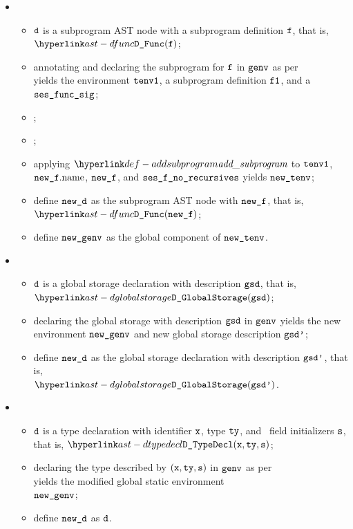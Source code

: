 \ProseParagraph
\OneApplies
\begin{itemize}
  \item {}
  \begin{itemize}
    \item $\texttt{d}$ is a subprogram AST node with a subprogram definition $\texttt{f}$, that is, $\DFunc(\vf)$;
    \item annotating and declaring the subprogram for $\texttt{f}$ in $\texttt{genv}$ as per \\
          yields the environment $\texttt{tenv1}$, a subprogram definition $\vfone$,
          and a \sideeffectdescriptorsetsterm{} $\texttt{ses\_func\_sig}$\ProseOrTypeError;
    \item \Proseannotatesubprogram{$\tenv$}{$\vfone$}{\vsesfuncsig}{$\newf$}{$\vsesf$}\ProseOrTypeError;
    \item {};
    \item applying $\addsubprogram$ to $\texttt{tenv1}$, $\texttt{new\_f}.\text{name}$, $\newf$, and $\texttt{ses\_f\_no\_recursives}$ yields $\texttt{new\_tenv}$;
    \item define $\texttt{new\_d}$ as the subprogram AST node with $\newf$, that is, $\DFunc(\newf)$;
    \item define $\texttt{new\_genv}$ as the global component of $\texttt{new\_tenv}$.
  \end{itemize}

  \item {}
  \begin{itemize}
    \item $\texttt{d}$ is a global storage declaration with description $\texttt{gsd}$, that is, \\ $\DGlobalStorage(\gsd)$;
    \item declaring the global storage with description $\texttt{gsd}$ in $\texttt{genv}$ yields the new environment
          $\texttt{new\_genv}$ and new global storage description $\texttt{gsd'}$\ProseOrTypeError;
    \item define $\texttt{new\_d}$ as the global storage declaration with description $\texttt{gsd'}$, that is, \\ $\DGlobalStorage(\gsdp)$.
  \end{itemize}

  \item {}
  \begin{itemize}
    \item $\texttt{d}$ is a type declaration with identifier $\texttt{x}$, type $\texttt{ty}$,
          and \optional\ field initializers $\texttt{s}$, that is, $\DTypeDecl(\vx, \tty, \vs)$;
    \item declaring the type described by $(\texttt{x}, \texttt{ty}, \texttt{s})$ in $\texttt{genv}$
          as per \\
           yields the modified global static environment \\
          $\texttt{new\_genv}$\ProseOrTypeError;
    \item define $\texttt{new\_d}$ as $\texttt{d}$.
  \end{itemize}
\end{itemize}

